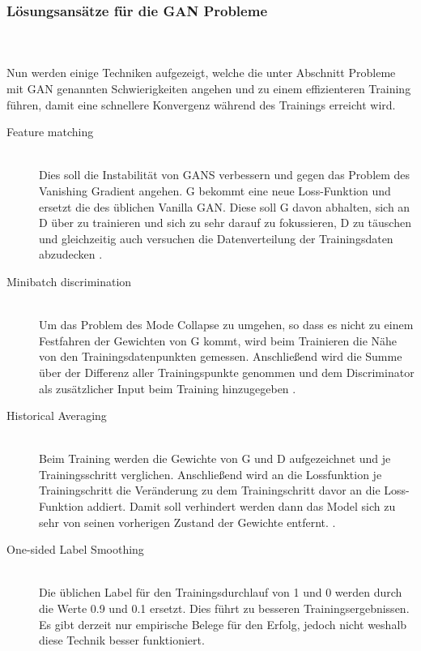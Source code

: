 \documentclass{llncs}
\begin{document}
\subsubsection{Lösungsansätze für die GAN Probleme}
~\\\\
Nun werden einige Techniken aufgezeigt, welche die unter Abschnitt Probleme mit GAN genannten Schwierigkeiten angehen und zu einem effizienteren Training führen, damit eine schnellere Konvergenz während des Trainings erreicht wird.
\\
\begin{description}
\item[Feature matching]
~\\
Dies soll die Instabilität von GANS verbessern und gegen das Problem des Vanishing Gradient angehen. G bekommt eine neue Loss-Funktion und ersetzt die des üblichen Vanilla GAN. Diese soll G davon abhalten, sich an D über zu trainieren und sich zu sehr darauf zu fokussieren, D zu täuschen und gleichzeitig auch versuchen die Datenverteilung der Trainingsdaten abzudecken \cite{improvingan}.\\

\item[Minibatch discrimination] 
~\\
Um das Problem des Mode Collapse zu umgehen, so dass es nicht zu einem Festfahren der Gewichten von G kommt, wird beim Trainieren die Nähe von den Trainingsdatenpunkten gemessen. Anschließend wird die Summe über der Differenz aller Trainingspunkte genommen und dem Discriminator als zusätzlicher Input beim Training hinzugegeben \cite{improvingan}.\\

\item[Historical Averaging]
~\\
Beim Training werden die Gewichte von G und D aufgezeichnet und je Trainingsschritt verglichen. Anschließend wird an die Lossfunktion je Trainingschritt die Veränderung zu dem Trainingschritt davor an die Loss-Funktion addiert. Damit soll verhindert werden dann das Model sich zu sehr von seinen vorherigen Zustand der Gewichte entfernt. \cite{improvingan}.\\

\item[One-sided Label Smoothing]
~\\
Die üblichen Label für den Trainingsdurchlauf von 1 und 0 werden durch die Werte 0.9 und 0.1 ersetzt. Dies führt zu besseren Trainingsergebnissen. Es gibt derzeit nur empirische Belege für den Erfolg, jedoch nicht weshalb diese Technik besser funktioniert\cite{improvingan}.\\


\end{description}
\end{document}
